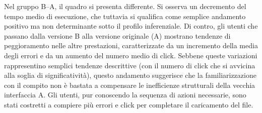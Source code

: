 Nel gruppo B--A, il quadro si presenta differente. Si osserva un decremento del tempo medio di esecuzione, che tuttavia si qualifica come semplice andamento positivo ma non determinante sotto il profilo inferenziale. Di contro, gli utenti che passano dalla versione B alla versione originale (A) mostrano tendenze di peggioramento nelle altre prestazioni, caratterizzate da un incremento della media degli errori e da un aumento del numero medio di click. Sebbene queste variazioni rappresentino semplici tendenze descrittive (con il numero di click che si avvicina alla soglia di significatività), questo andamento suggerisce che la familiarizzazione con il compito non è bastata a compensare le inefficienze strutturali della vecchia interfaccia A. Gli utenti, pur conoscendo la sequenza di azioni necessarie, sono stati costretti a compiere più errori e click per completare il caricamento del file.


